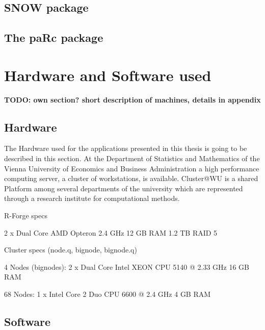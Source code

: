 \begin{itemize}





\subsection{SNOW package}
\subsection{The paRc package}
\subsection{}

\section{Hardware and Software used}

\textbf{TODO: own section? short description of machines, details in
  appendix}

\subsection{Hardware}
The Hardware used for the applications presented in this thesis is
going to be described in this section.
At the Department of Statistics and Mathematics of the Vienna
University of Economics and Business Administration a high performance
computing server, a cluster of workstations, is
available. Cluster@WU is a shared Platform among several departments
of the university which are represented through a research institute
for computational methods. 
\begin{table}

\end{table}
R-Forge specs

2 x Dual Core AMD Opteron 2.4 GHz
12 GB RAM
1.2 TB RAID 5

Cluster specs (node.q, bignode, bignode.q)

4 Nodes (bignodes):
2 x Dual Core Intel XEON CPU 5140 @ 2.33 GHz
16 GB RAM

68 Nodes:
1 x Intel Core 2 Duo CPU 6600 @ 2.4 GHz
4 GB RAM

\subsection{Software}


\end{itemize}

